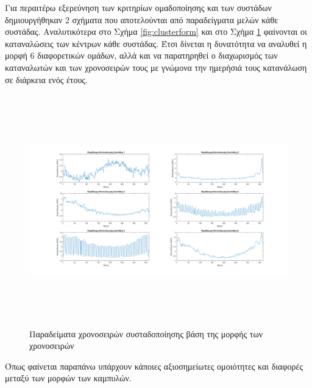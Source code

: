\newpage
Για περαιτέρω εξερεύνηση των κριτηρίων ομαδοποίησης και των συστάδων δημιουργήθηκαν 2 σχήματα που αποτελούνται από παραδείγματα μελών κάθε συστάδας. Αναλυτικότερα στο Σχήμα \ref{fig:clusterform} και στο Σχήμα \ref{fig:clusterconslevel} φαίνονται οι καταναλώσεις των κέντρων κάθε συστάδας. Έτσι δίνεται η δυνατότητα να αναλυθεί η μορφή 6 διαφορετικών ομάδων, αλλά και να παρατηρηθεί ο διαχωρισμός των καταναλωτών και των χρονοσειρών τους με γνώμονα την ημερήσιά τους κατανάλωση σε διάρκεια ενός έτους.\par
\begin{figure}[ht!]
\centering
\includegraphics[width=180mm, height=100mm]{../../plots/Consumption_Analysis/gr_cluster_form.png}
\caption{Παραδείματα χρονοσειρών συσταδοποίησης βάση της μορφής των χρονοσειρών}
\label{fig:clusterconslevel}
\end{figure}
Όπως φαίνεται παραπάνω υπάρχουν κάποιες αξιοσημείωτες ομοιότητες και διαφορές μεταξύ των μορφών των καμπυλών.
